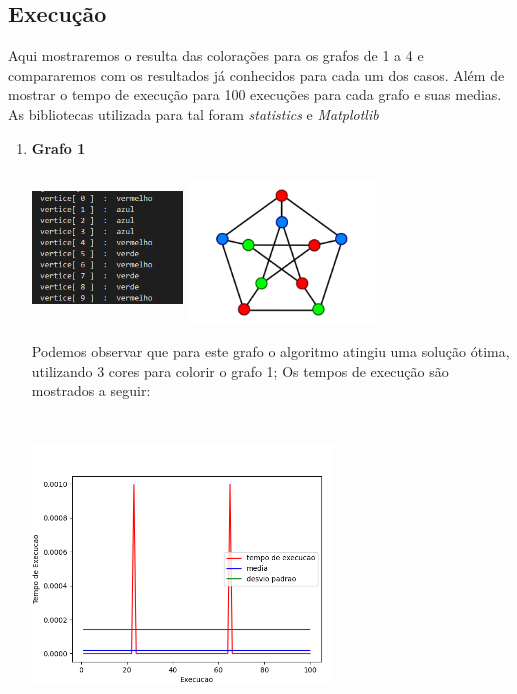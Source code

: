 \documentclass[12pt,openright,oneside,a4paper,brazil]{abntex2}
\begin{document}
\subsection{Execução}
Aqui mostraremos o resulta das colorações para os grafos de 1 a 4 e compararemos com os resultados já conhecidos para cada um dos casos. Além de mostrar o tempo de execução para 100 execuções para cada grafo e suas medias. As bibliotecas utilizada para tal foram \textit{statistics} e \textit{Matplotlib} 
\begin{enumerate}
	\item \textbf{Grafo 1}
	
		\includegraphics[width=4cm,height=4cm]{Coloracao-grafo1.png}
		\includegraphics[width=5cm]{grafo1.png}
		
		Podemos observar que para este grafo o algoritmo atingiu uma solução ótima, utilizando 3 cores para colorir o grafo 1;
		Os tempos de execução são mostrados a seguir:
		
		\begin{center}
			\includegraphics[width=8cm,height=8cm]{grafico-grafo1.png}
			

\end{center}
\end{enumerate}
\end{document}
